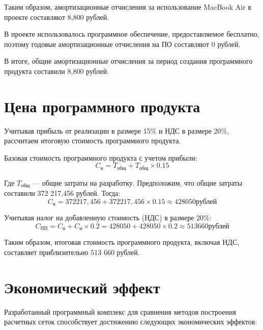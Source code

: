 \documentclass[a4paper,14pt,russian]{extreport}
\renewcommand{\_}{\kern-1.5pt\textunderscore\kern-1.5pt}
\begin{document}
\par Таким образом, амортизационные отчисления за использование MacBook Air в проекте составляют 8,800 рублей.

\par В проекте использовалось программное обеспечение, предоставляемое бесплатно, поэтому годовые амортизационные отчисления на ПО составляют 0 рублей.

\par В итоге, общие амортизационные отчисления за период создания программного продукта составили 8,800 рублей.
\section{Цена программного продукта}
\par Учитывая прибыль от реализации в размере 15\% и НДС в размере 20\%, рассчитаем итоговую стоимость программного продукта.

\par Базовая стоимость программного продукта с учетом прибыли:
\begin{equation*}
    C_{\text{н}} = T_{\text{общ}} + T_{\text{общ}} \times 0.15
\end{equation*}
\par Где $T_{\text{общ}}$ — общие затраты на разработку. Предположим, что общие затраты составили 372 217,456 рублей. Тогда:
\begin{equation*}
    C_{\text{н}} = 372 217,456 + 372 217,456 \times 0.15 \approx 428 050 \text{рублей}
\end{equation*}
\par Учитывая налог на добавленную стоимость (НДС) в размере 20\%:
\begin{equation*}
    C_{\text{ПП}} = C_{\text{н}} + C_{\text{н}} \times 0.2 = 428 050 + 428 050 \times 0.2 \approx 513 660 \text{рублей}
\end{equation*}
\par Таким образом, итоговая стоимость программного продукта, включая НДС, составляет приблизительно 513 660 рублей.

\section{Экономический эффект}
\par Разработанный программный комплекс для сравнения методов построения расчетных сеток способствует достижению следующих экономических эффектов:
\end{document}
